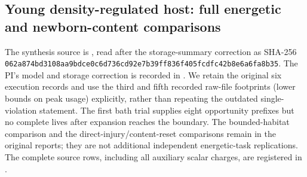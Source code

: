 \subsection*{Young density-regulated host: full energetic and newborn-content comparisons}
The synthesis source is , read after the storage-summary correction as SHA-256 \texttt{062a874b\allowbreak{}d3108aa9\allowbreak{}bdce0c6d\allowbreak{}736cd92e\allowbreak{}7b39ff83\allowbreak{}6f405fcd\allowbreak{}fc42b8e6\allowbreak{}a6fa8b35}. The PI's model and storage correction is recorded in . We retain the original six execution records and use the third and fifth recorded raw-file footprints (lower bounds on peak usage) explicitly, rather than repeating the outdated single-violation statement. The first bath trial supplies eight opportunity prefixes but no complete lives after expansion reaches the boundary. The bounded-habitat comparison and the direct-injury/content-reset comparisons remain in the original reports; they are not additional independent energetic-task replications. The complete source rows, including all auxiliary scalar charges, are registered in .

